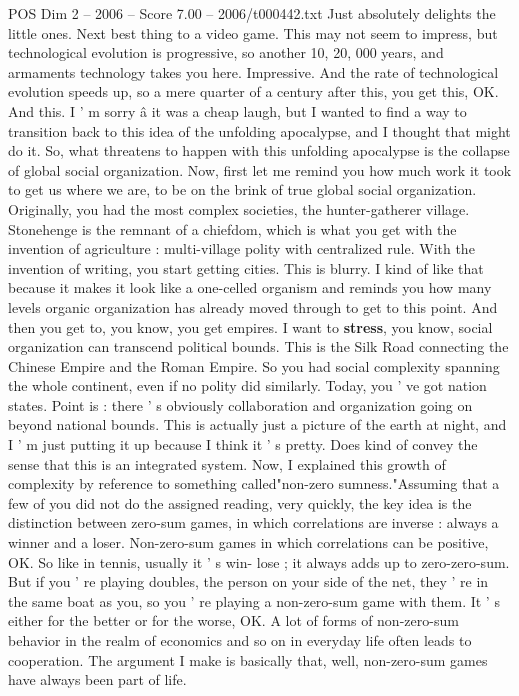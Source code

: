 \begin{textsample}{POS Dim 2 – 2006 – Score 7.00 – 2006/t000442.txt}
Just absolutely delights the little ones.
Next best thing to a video game.
This may not seem to impress, but technological evolution is progressive, so another 10, 20, 000 years, and armaments technology takes you here.
Impressive.
And the rate of technological evolution speeds up, so a mere quarter of a century after this, you get this, OK.
And this.
I ' m sorry â it was a cheap laugh, but I wanted to find a way to transition back to this idea of the unfolding apocalypse, and I thought that might do it.
So, what threatens to happen with this unfolding apocalypse is the collapse of global social organization.
Now, first let me remind you how much work it took to get us where we are, to be on the brink of true global social organization.
Originally, you had the most complex societies, the hunter-gatherer village.
Stonehenge is the remnant of a chiefdom, which is what you get with the invention of agriculture : multi-village polity with centralized rule.
With the invention of writing, you start getting cities.
This is blurry.
I kind of like that because it makes it look like a one-celled organism and reminds you how many levels organic organization has already moved through to get to this point.
And then you get to, you know, you get empires.
I want to \textbf{stress}, you know, social organization can transcend political bounds.
This is the Silk Road connecting the Chinese Empire and the Roman Empire.
So you had social complexity spanning the whole continent, even if no polity did similarly.
Today, you ' ve got nation states.
Point is : there ' s obviously collaboration and organization going on beyond national bounds.
This is actually just a picture of the earth at night, and I ' m just putting it up because I think it ' s pretty.
Does kind of convey the sense that this is an integrated system.
Now, I explained this growth of complexity by reference to something called"non-zero sumness."Assuming that a few of you did not do the assigned reading, very quickly, the key idea is the distinction between zero-sum games, in which correlations are inverse : always a winner and a loser.
Non-zero-sum games in which correlations can be positive, OK.
So like in tennis, usually it ' s win- lose ; it always adds up to zero-zero-sum.
But if you ' re playing doubles, the person on your side of the net, they ' re in the same boat as you, so you ' re playing a non-zero-sum game with them.
It ' s either for the better or for the worse, OK.
A lot of forms of non-zero-sum behavior in the realm of economics and so on in everyday life often leads to cooperation.
The argument I make is basically that, well, non-zero-sum games have always been part of life.

\end{textsample}
